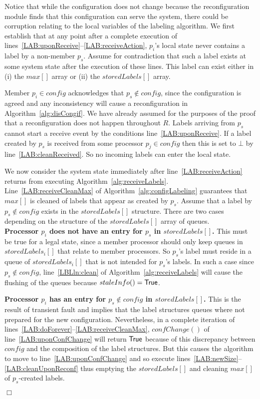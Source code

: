 \documentclass[11pt]{article}
\newenvironment{proof}{\noindent{\bf Proof.}}{\hfill$\Box$}
\begin{document}
\begin{proof}
Notice that while the configuration does not change because the reconfiguration module finds that this configuration can serve the system, there could be corruption relating to the local variables of the labeling algorithm.
We first establish that at any point after a complete execution of lines~\ref{LAB:uponReceive}--\ref{LAB:receiveAction}, $p_i$'s local state never contains a label by a non-member $p_s$.
Assume for contradiction that such a label exists at some system state after the execution of these lines.
This label can exist either in (i) the $max[]$ array or (ii) the $storedLabels[]$ array.

Member $p_i \in config$ acknowledges that $p_s \not \in config$, since the configuration is agreed and any inconsistency will cause a reconfiguration in Algorithm~\ref{alg:disCongif}. 
We have already assumed for the purposes of the proof that a reconfiguration does not happen throughout $R$.
Labels arriving from $p_s$ cannot start a receive event by the conditions line~\ref{LAB:uponReceive}. 
If a label created by $p_s$ is received from some processor $p_j \in config$ then this is set to $\bot$ by line~\ref{LAB:cleanReceived}. 
So no incoming labels can enter the local state.

We now consider the system state immediately after line~\ref{LAB:receiveAction} returns from executing Algorithm~\ref{alg:receiveLabels}.
Line~\ref{LAB:receiveCleanMax} of Algorithm~\ref{alg:configLabeling} guarantees that $max[]$ is cleaned of labels that appear as created by $p_s$.
Assume that a label by $p_s \not \in config$ exists in the $storedLabels[]$ structure.
There are two cases depending on the structure of the $storedLabels[]$ array of queues.\\
 \textbf{Processor $p_i$ does not have an entry for $p_s$ in $storedLabels[]$.}
This must be true for a legal state, since a member processor should only keep queues in $storedLabels_i[]$ that relate to member processors.
So $p_s$'s label must reside in a queue of $storedLabels_i[]$ that is not intended for $p_s$'s labels. 
In such a case since $p_s \not \in config$, line~\ref{LBLln:clean} of Algorithm~\ref{alg:receiveLabels} will cause the flushing of the queues because $staleInfo() = \sf True$.

 \textbf{Processor $p_i$ has an entry for $p_s \not \in config$ in $storedLabels[]$.}
This is the result of transient fault and implies that the label structures queues where not prepared for the new configuration.
Nevertheless, in a complete iteration of lines~\ref{LAB:doForever}--\ref{LAB:receiveCleanMax}, $confChange()$ of line~\ref{LAB:uponConfChange} will return $\sf True$ because of this discrepancy between $config$ and the composition of the label structures.
But this causes the algorithm to move to line~\ref{LAB:uponConfChange} and so execute lines~\ref{LAB:newSize}--\ref{LAB:cleanUponReconf} thus emptying the $storedLabels[]$ and cleaning $max[]$ of $p_s$-created labels.


\end{proof}
\end{document}
